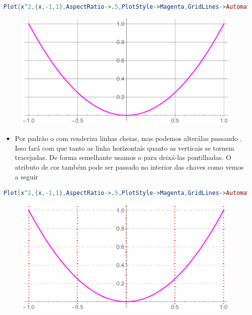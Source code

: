 \documentclass[a4paper, 12pt]{article}
\begin{document}
\begin{itemize}
\begin{lstlisting}[language=Mathematica]
Plot[x^2,{x,-1,1},AspectRatio->.5,PlotStyle->Magenta,GridLines->Automatic]
\end{lstlisting}
\begin{figure}[!h]\label{parabola}
	\centering
	\includegraphics[scale=.55]{images/grid}
\end{figure}
		
		\begin{itemize}
			\item[] Por padrão o  com  renderiza linhas cheias, mas podemos alterálas passando . Isso fará com que tanto as linha horizontais quanto as verticais se tornem tracejadas. De forma semelhante usamos o  para deixá-las pontilhadas. O atributo de cor também pode ser passado no interior das chaves como vemos a seguir
		\end{itemize}

\begin{lstlisting}[language=Mathematica]
Plot[x^2,{x,-1,1},AspectRatio->.5,PlotStyle->Magenta,GridLines->Automatic,GridLinesStyle->{{Red, Dotted, Thick},{Gray, Dotted}}}]
\end{lstlisting}
\begin{figure}[!h]\label{parabola}
	\centering
	\includegraphics[scale=.85]{images/gridStyle}
\end{figure}


\end{itemize}
\end{document}
